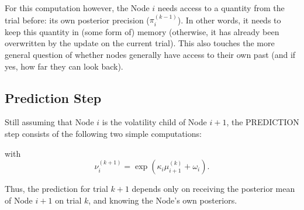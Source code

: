 \noindent
{}%
\vspace{0.5cm}

\noindent
For this computation however, the Node $i$ needs access to a quantity from the trial before: its own posterior precision ($\pi_i^{(k-1)}$). In other words, it needs to keep this quantity in (some form of) memory (otherwise, it has already been overwritten by the update on the current trial). This also touches the more general question of whether nodes generally have access to their own past (and if yes, how far they can look back).


\subsection{Prediction Step}
Still assuming that Node $i$ is the volatility child of Node $i+1$, the \textsf{PREDICTION step} consists of the following two simple computations:
\vspace{0.5cm}

\noindent
{}%
\vspace{0.5cm}

\noindent
with
\begin{equation*}
\nu_i^{(k+1)} = \exp(\kappa_i \mu_{i+1}^{(k)} + \omega_i).
\end{equation*}

Thus, the prediction for trial $k+1$ depends only on receiving the posterior mean of Node $i+1$ on trial $k$, and knowing the Node's own posteriors.\\

